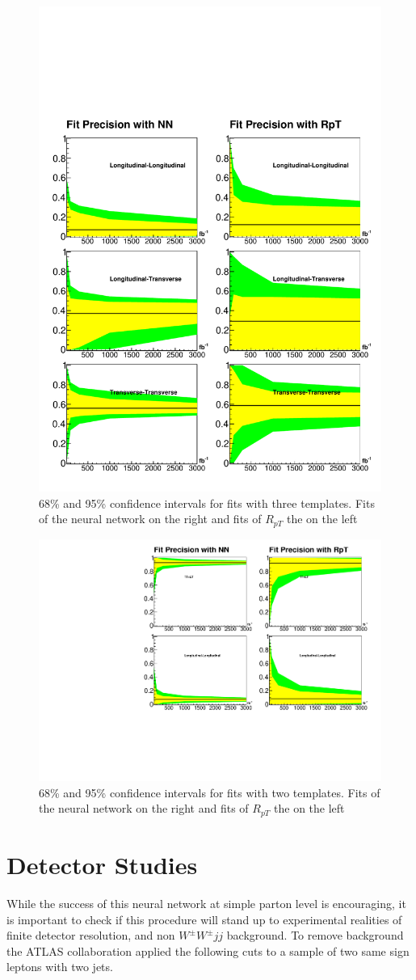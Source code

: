 \documentclass[10pt,twocolumn]{article}
\def\ssWW{\ensuremath{ W^{\pm}W^{\pm}jj }\xspace}
\begin{document}
\begin{figure}
\includegraphics[width=.45\textwidth]{./fig/sens_1.pdf}
\caption{ \label{fig:sen_3} 68\% and 95\% confidence intervals for fits with three templates. Fits of the neural network on the right and fits of $R_{pT}$ the on the left}
\end{figure}


\begin{figure}
\includegraphics[width=.45\textwidth]{./fig/sens_2.pdf}
\caption{\label{fig:sen_2} 68\% and 95\% confidence intervals for fits with two templates. Fits of the neural network on the right and fits of $R_{pT}$ the on the left}

\end{figure}


\section{Detector Studies}

While the success of this neural network at simple parton level is encouraging, it is important to check if this procedure will stand
up to experimental realities of finite detector resolution, and non \ssWW background. To remove background the ATLAS collaboration applied
the following cuts to a sample of two same sign leptons with two jets.
\end{document}
